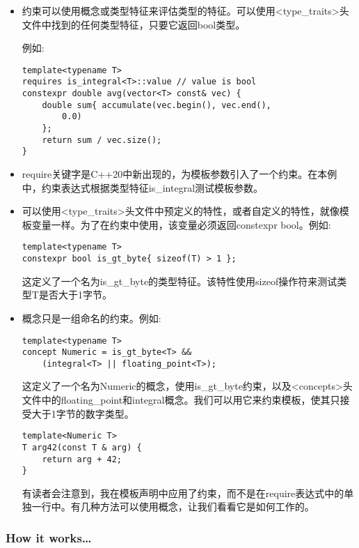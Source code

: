 \begin{itemize}
\item 
约束可以使用概念或类型特征来评估类型的特征。可以使用<type\_traits>头文件中找到的任何类型特征，只要它返回bool类型。

例如:

\begin{lstlisting}[style=styleCXX]
template<typename T>
requires is_integral<T>::value // value is bool
constexpr double avg(vector<T> const& vec) {
	double sum{ accumulate(vec.begin(), vec.end(),
		0.0)
	};
	return sum / vec.size();
}
\end{lstlisting}

\item 
require关键字是C++20中新出现的，为模板参数引入了一个约束。在本例中，约束表达式根据类型特征is\_integral测试模板参数。

\item 
可以使用<type\_traits>头文件中预定义的特性，或者自定义的特性，就像模板变量一样。为了在约束中使用，该变量必须返回constexpr bool。例如:

\begin{lstlisting}[style=styleCXX]
template<typename T>
constexpr bool is_gt_byte{ sizeof(T) > 1 };
\end{lstlisting}

这定义了一个名为is\_gt\_byte的类型特征。该特性使用sizeof操作符来测试类型T是否大于1字节。

\item 
概念只是一组命名的约束。例如:

\begin{lstlisting}[style=styleCXX]
template<typename T>
concept Numeric = is_gt_byte<T> &&
	(integral<T> || floating_point<T>);
\end{lstlisting}

这定义了一个名为Numeric的概念，使用is\_gt\_byte约束，以及<concepts>头文件中的floating\_point和integral概念。我们可以用它来约束模板，使其只接受大于1字节的数字类型。

\begin{lstlisting}[style=styleCXX]
template<Numeric T>
T arg42(const T & arg) {
	return arg + 42;
}
\end{lstlisting}

有读者会注意到，我在模板声明中应用了约束，而不是在require表达式中的单独一行中。有几种方法可以使用概念，让我们看看它是如何工作的。
\end{itemize}

\subsubsection{How it works…}

